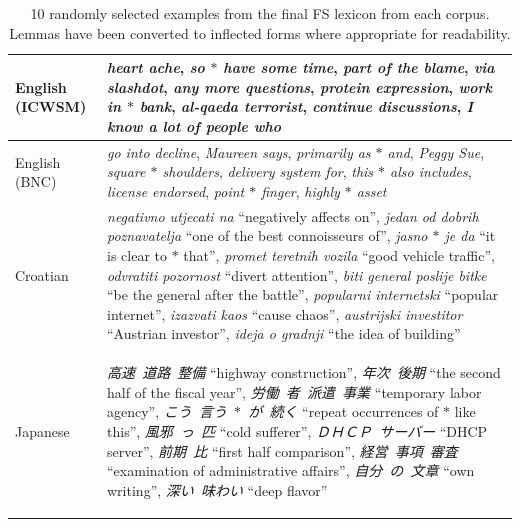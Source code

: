 \documentclass[11pt,letterpaper]{article}
\newcommand{\gap}{$*$\xspace}
\newcommand{\ex}[1]{\textit{#1}\xspace}
\newcommand{\gl}[1]{``#1''\xspace}
\begin{document}
\begin{table}[!t]
 
 \begin{center}
 \begin{tabular}{p{1.5cm}p{14cm}}
\toprule
English (ICWSM) & \ex{heart ache}, \ex{so \gap have some time}, \ex{part of the blame}, \ex{via slashdot}, \ex{any more questions}, \ex{protein expression}, \ex{work in \gap bank}, \ex{al-qaeda terrorist}, \ex{continue discussions}, \ex{I know a lot of people who}\\
\midrule
English (BNC) & \ex{go into decline}, \ex{Maureen says}, \ex{primarily as \gap and}, \ex{Peggy Sue}, \ex{square \gap shoulders}, \ex{delivery system for}, \ex{this \gap also includes}, \ex{license endorsed}, \ex{point \gap finger}, \ex{highly \gap asset}\\
\midrule
Croatian & \ex{negativno utjecati na} \gl{negatively affects on},
\ex{jedan od dobrih poznavatelja} \gl{one of the best connoisseurs of}, \ex{jasno \gap je da} \gl{it is clear to \gap that}, \ex{promet teretnih vozila} \gl{good vehicle traffic}, \ex{odvratiti pozornost} \gl{divert attention}, \ex{biti general poslije bitke} \gl{be the general after the battle}, \ex{popularni internetski} \gl{popular internet}, \ex{izazvati kaos} \gl{cause chaos}, \ex{austrijski investitor} \gl{Austrian investor}, \ex{ideja o gradnji} \gl{the idea of building} \\
\midrule
Japanese & \begin{CJK*}{UTF8}{min} \ex{高速\ 道路\ 整備} \gl{highway construction}, \ex{年次\ 後期} \gl{the second half of the fiscal year}, \ex{労働\ 者\ 派遣\ 事業} \gl{temporary labor agency}, \ex{こう\ 言う\ \gap\ が\ 続く} \gl{repeat occurrences of \gap like this},  \ex{風邪\ っ\ 匹} \gl{cold sufferer}, \ex{ＤＨＣＰ\ サーバー} \gl{DHCP server}, \ex{前期\ 比} \gl{first half comparison}, \ex{経営\ 事項\ 審査 } \gl{examination of administrative affairs}, \ex{自分\ の\ 文章} \gl{own writing}, \ex{深い\ 味わい} \gl{deep flavor} \end{CJK*} \\
\bottomrule
\end{tabular}
  \caption{10 randomly selected examples from the final FS lexicon from each corpus. Lemmas have been converted to inflected forms where appropriate for readability.}
	 \label{tab:sample}

 \end{center}

\end{table}
\end{document}

